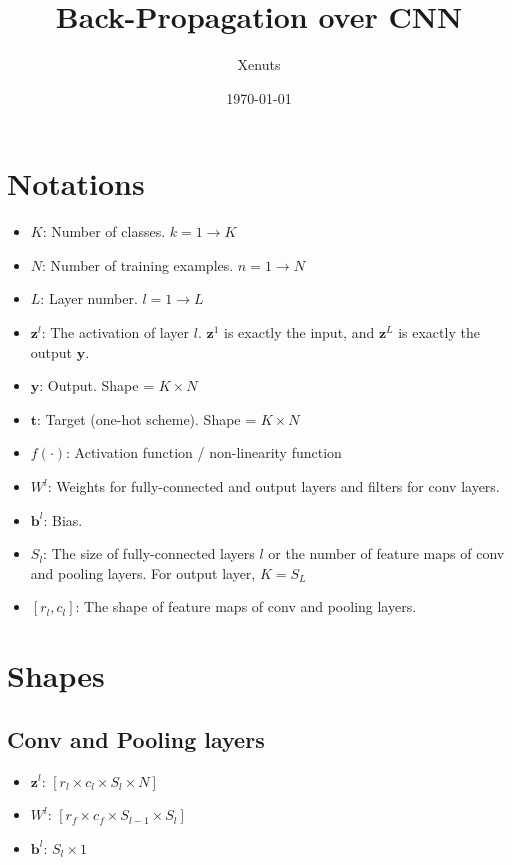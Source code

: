 \documentclass[11pt]{article}
\author{Xenuts}
\date{\today}
\title{Back-Propagation over CNN}
\begin{document}
\maketitle
\tableofcontents


\section{Notations}
\label{sec-1}
\begin{itemize}
\item \(K\): Number of classes. \(k = 1 \rightarrow K\)
\item \(N\): Number of training examples. \(n = 1 \rightarrow N\)
\item \(L\): Layer number. \(l = 1 \rightarrow L\)
\item \(\mathbf{z}^{l}\): The activation of layer \(l\). \(\mathbf{z}^{1}\) is exactly the input, and \(\mathbf{z}^{L}\) is exactly the output \(\mathbf{y}\).
\item \(\mathbf{y}\): Output. Shape = \(K \times N\)
\item \(\mathbf{t}\): Target (one-hot scheme). Shape = \(K \times N\)
\item \(f(\cdot)\): Activation function / non-linearity function
\item \(W^{l}\): Weights for fully-connected and output layers and filters for conv layers.
\item \(\mathbf{b}^{l}\): Bias.
\item \(S_{l}\): The size of fully-connected layers \(l\) or the number of feature maps of conv and pooling layers. For output layer, \(K = S_{L}\)
\item \([r_{l}, c_{l}]\): The shape of feature maps of conv and pooling layers.
\end{itemize}

\section{Shapes}
\label{sec-2}
\subsection{Conv and Pooling layers}
\label{sec-2-1}
\begin{itemize}
\item \(\mathbf{z}^{l}\): \([r_{l} \times c_{l} \times S_{l} \times N]\)
\item \(W^{l}\): \([r_{f} \times c_{f} \times S_{l-1} \times S_{l}]\)
\item \(\mathbf{b}^{l}\): \(S_{l} \times 1\)
\end{itemize}
\end{document}
